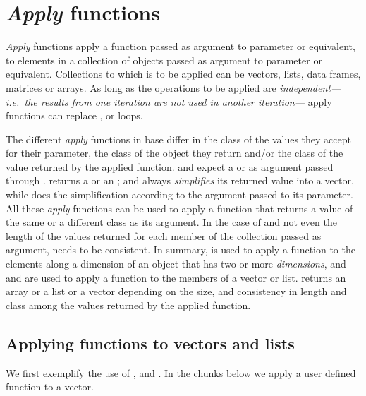 \documentclass[krantz2]{krantz}\usepackage{knitr}%
\begin{document}
\section[Apply functions]{\emph{Apply} functions}\label{sec:data:apply}

\emph{Apply} functions apply a function passed as argument to parameter  or equivalent, to elements in a collection of \Rlang objects passed as argument to parameter  or equivalent. Collections to which  is to be applied can be vectors, lists, data frames, matrices or arrays. As long as the operations to be applied are \emph{independent---i.e.\ the results from one iteration are not used in another iteration---} apply functions can replace ,  or  loops.

The different \emph{apply} functions in base \Rlang differ in the class of the values they accept for their  parameter, the class of the object they return and/or the class of the value returned by the applied function.  and  expect a  or  as argument passed through .  returns a  or an ; and  always \emph{simplifies} its returned value into a vector, while  does the simplification according to the argument passed to its  parameter. All these \emph{apply} functions can be used to apply a \Rlang function that returns a value of the same or a different class as its argument. In the case of  and  not even the length of the values returned for each member of the collection passed as argument, needs to be consistent. In summary,  is used to apply a function to the elements along a dimension of an object that has two or more \emph{dimensions}, and  and  are used to apply a function to the members of a vector or list.  returns an array or a list or a vector depending on the size, and consistency in length and class among the values returned by the applied function.

\subsection{Applying functions to vectors and lists}

We first exemplify the use of ,  and . In the chunks below we apply a user defined function to a vector.
\end{document}
